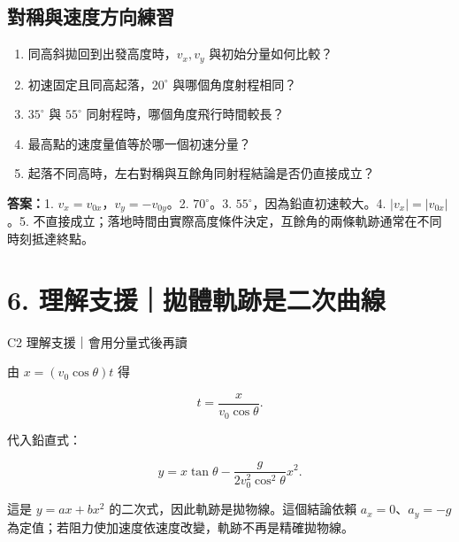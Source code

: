 \documentclass[11pt,a4paper]{article}
\providecommand{\tightlist}{%
  \setlength{\itemsep}{0pt}\setlength{\parskip}{0pt}}
\begin{document}
\begin{HandoutSelfCheck}

\subsection{對稱與速度方向練習}\label{ux5c0dux7a31ux8207ux901fux5ea6ux65b9ux5411ux7df4ux7fd2}

\begin{enumerate}
\def\labelenumi{\arabic{enumi}.}
\tightlist
\item
  同高斜拋回到出發高度時，\(v_x,v_y\) 與初始分量如何比較？
\item
  初速固定且同高起落，\(20^\circ\) 與哪個角度射程相同？
\item
  \(35^\circ\) 與 \(55^\circ\) 同射程時，哪個角度飛行時間較長？
\item
  最高點的速度量值等於哪一個初速分量？
\item
  起落不同高時，左右對稱與互餘角同射程結論是否仍直接成立？
\end{enumerate}

\textbf{答案：}1. \(v_x=v_{0x}\)，\(v_y=-v_{0y}\)。2. \(70^\circ\)。3. \(55^\circ\)，因為鉛直初速較大。4. \(|v_x|=|v_{0x}|\)。5. 不直接成立；落地時間由實際高度條件決定，互餘角的兩條軌跡通常在不同時刻抵達終點。

\end{HandoutSelfCheck}

\section{6. 理解支援｜拋體軌跡是二次曲線}\label{ux7406ux89e3ux652fux63f4ux62cbux9ad4ux8eccux8de1ux662fux4e8cux6b21ux66f2ux7dda}

{C2 理解支援｜會用分量式後再讀}

由 \(x=(v_0\cos\theta)t\) 得

\[
t=\frac{x}{v_0\cos\theta}.
\]

代入鉛直式：

\[
y=x\tan\theta-
\frac{g}{2v_0^2\cos^2\theta}x^2.
\]

這是 \(y=ax+bx^2\) 的二次式，因此軌跡是拋物線。這個結論依賴 \(a_x=0\)、\(a_y=-g\) 為定值；若阻力使加速度依速度改變，軌跡不再是精確拋物線。
\end{document}
